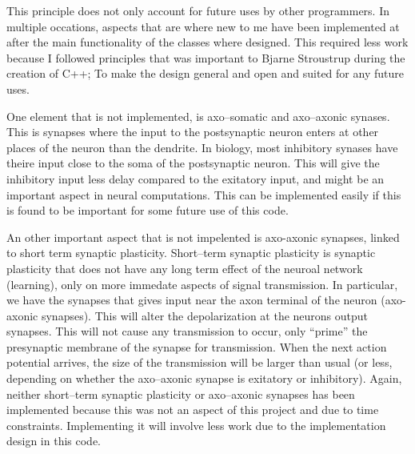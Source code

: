 This principle does not only account for future uses by other programmers.
In multiple occations, aspects that are where new to me have been implemented at after the main functionality of the classes where designed. 
This required less work because I followed principles that was important to Bjarne Stroustrup during the creation of C++; To make the design general and open and suited for any future uses.%


One element that is not implemented, is axo--somatic and axo--axonic synases. 
This is synapses where the input to the postsynaptic neuron enters at other places of the neuron than the dendrite. 
In biology, most inhibitory synases have theire input close to the soma of the postsynaptic neuron. 
This will give the inhibitory input less delay compared to the exitatory input, and might be an important aspect in neural computations.
This can be implemented easily if this is found to be important for some future use of this code.

An other important aspect that is not impelented is axo-axonic synapses, linked to short term synaptic plasticity.
Short--term synaptic plasticity is synaptic plasticity that does not have any long term effect of the neuroal network (learning), only on more immedate aspects of signal transmission.
In particular, we have the synapses that gives input near the axon terminal of the neuron (axo-axonic synapses). This will alter the depolarization at the neurons output synapses. %
This will not cause any transmission to occur, only ``prime'' the presynaptic membrane of the synapse for transmission.
When the next action potential arrives, the size of the transmission will be larger than usual (or less, depending on whether the axo--axonic synapse is exitatory or inhibitory).
Again, neither short--term synaptic plasticity or axo--axonic synapses has been implemented because this was not an aspect of this project and due to time constraints.
Implementing it will involve less work due to the implementation design in this code.

